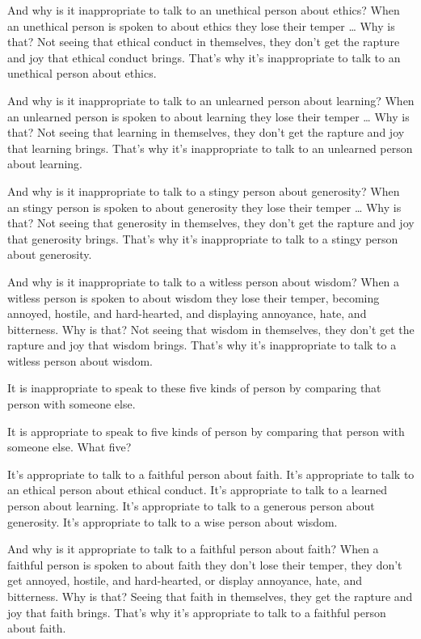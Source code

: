 \documentclass[12pt,openany]{book}%
\begin{document}
And why is it inappropriate to talk to an unethical person about ethics? When an unethical person is spoken to about ethics they lose their temper … Why is that? Not seeing that ethical conduct in themselves, they don’t get the rapture and joy that ethical conduct brings. That’s why it’s inappropriate to talk to an unethical person about ethics. 

And why is it inappropriate to talk to an unlearned person about learning? When an unlearned person is spoken to about learning they lose their temper … Why is that? Not seeing that learning in themselves, they don’t get the rapture and joy that learning brings. That’s why it’s inappropriate to talk to an unlearned person about learning. 

And why is it inappropriate to talk to a stingy person about generosity? When an stingy person is spoken to about generosity they lose their temper … Why is that? Not seeing that generosity in themselves, they don’t get the rapture and joy that generosity brings. That’s why it’s inappropriate to talk to a stingy person about generosity. 

And why is it inappropriate to talk to a witless person about wisdom? When a witless person is spoken to about wisdom they lose their temper, becoming annoyed, hostile, and hard-hearted, and displaying annoyance, hate, and bitterness. Why is that? Not seeing that wisdom in themselves, they don’t get the rapture and joy that wisdom brings. That’s why it’s inappropriate to talk to a witless person about wisdom. 

It is inappropriate to speak to these five kinds of person by comparing that person with someone else. 

It is appropriate to speak to five kinds of person by comparing that person with someone else. What five? 

It’s appropriate to talk to a faithful person about faith. It’s appropriate to talk to an ethical person about ethical conduct. It’s appropriate to talk to a learned person about learning. It’s appropriate to talk to a generous person about generosity. It’s appropriate to talk to a wise person about wisdom. 

And why is it appropriate to talk to a faithful person about faith? When a faithful person is spoken to about faith they don’t lose their temper, they don’t get annoyed, hostile, and hard-hearted, or display annoyance, hate, and bitterness. Why is that? Seeing that faith in themselves, they get the rapture and joy that faith brings. That’s why it’s appropriate to talk to a faithful person about faith. 
\end{document}
